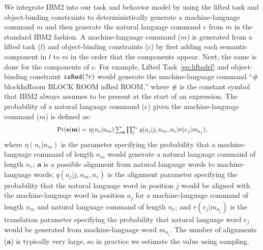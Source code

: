 \documentclass[conference]{IEEEtran}
\newcommand*{\Scale}[2][4]{\scalebox{#1}{$#2$}}%
\begin{document}
We integrate IBM2 into our task and behavior model by using the lifted task and object-binding constraints to deterministically generate a machine-language command $m$ and then generate the natural language command $e$ from $m$ in the standard IBM2 fashion. 
A machine-language command ($m$) is generated from a lifted task ($l$) and object-binding constraints ($c$) by first adding each semantic component in $l$
to $m$ in the order that the components appear. Next, the same is done for the components of $c$. For example, Lifted Task~\ref{eq:liftedrf} and object-binding constraint ${\tt isRed}(?r)$ would generate the machine-language command 
``\# blockInRoom BLOCK ROOM isRed ROOM,'' where \# is the constant symbol that IBM2 always assumes to be present at the start of an expression. The probability of a natural language command ($e$) given the machine-language command ($m$) is defined as:
\begin{equation}
\Scale[0.9]{
\Pr({\mathbf e} | {\mathbf m}) = \eta(n_e | n_m) \sum_{\mathbf a} \prod_j^{n_e} q(a_j | j, n_m, n_e) r(e_j | m_{a_j}),
}
\end{equation}
\noindent where $\eta(n_e | n_m)$ is the parameter specifying the probability that a machine-language command of length $n_m$ %
would generate a natural language command of length $n_e$; %
${\mathbf a}$ is a possible alignment from natural language words to machine-language words; $q(a_j | j, n_m, n_e)$ is the alignment parameter specifying the probability that the natural language word in position $j$ would be aligned with the machine-language word in position $a_j$ for a machine-language command of length $n_m$ and natural language command of length $n_e$;  and $r(e_j | m_{a_j})$ is the translation parameter specifying the probability that natural language word $e_j$ would be generated from machine-language word $m_{a_j}$. The number of alignments (${\mathbf a}$) is typically very large, so in practice we estimate the value using sampling. 
 
\end{document}
